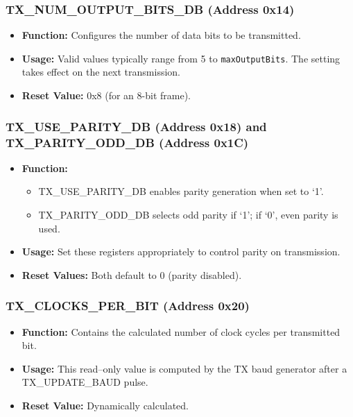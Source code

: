 \subsubsection{TX\_NUM\_OUTPUT\_BITS\_DB (Address 0x14)}
\begin{itemize}[noitemsep]
    \item \textbf{Function:} Configures the number of data bits to be transmitted.
    \item \textbf{Usage:} Valid values typically range from 5 to \texttt{maxOutputBits}. The setting takes effect on the next transmission.
    \item \textbf{Reset Value:} 0x8 (for an 8-bit frame).
\end{itemize}

\subsubsection{TX\_USE\_PARITY\_DB (Address 0x18) and TX\_PARITY\_ODD\_DB (Address 0x1C)}
\begin{itemize}[noitemsep]
    \item \textbf{Function:}
    \begin{itemize}
        \item TX\_USE\_PARITY\_DB enables parity generation when set to ‘1’.
        \item TX\_PARITY\_ODD\_DB selects odd parity if ‘1’; if ‘0’, even parity is used.
    \end{itemize}
    \item \textbf{Usage:} Set these registers appropriately to control parity on transmission.
    \item \textbf{Reset Values:} Both default to 0 (parity disabled).
\end{itemize}

\subsubsection{TX\_CLOCKS\_PER\_BIT (Address 0x20)}
\begin{itemize}[noitemsep]
    \item \textbf{Function:} Contains the calculated number of clock cycles per transmitted bit.
    \item \textbf{Usage:} This read–only value is computed by the TX baud generator after a TX\_UPDATE\_BAUD pulse.
    \item \textbf{Reset Value:} Dynamically calculated.
\end{itemize}

